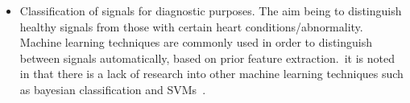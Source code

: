 \documentclass[titlepage]{scrartcl}
\begin{document}
\begin{itemize}
    \item Classification of signals for diagnostic purposes. The aim being to
        distinguish healthy signals from those with certain heart
        conditions/abnormality. Machine learning techniques are commonly used
        in order to distinguish between signals automatically, based on prior
        feature extraction.\
        it is noted in  that there is a lack of research into other machine
        learning techniques such as bayesian classification and
        SVMs~\citeyearpar{}.
\end{itemize}

\pagebreak{}
\printbibliography{}
\end{document}
